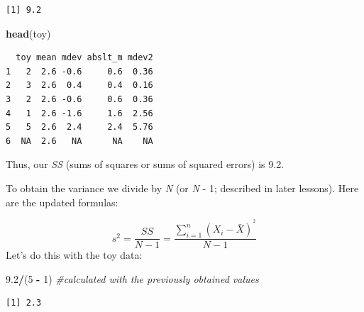 \documentclass[
  11pt,
]{book}
\newenvironment{Shaded}{\begin{snugshade}}{\end{snugshade}}
\newcommand{\AttributeTok}[1]{\textcolor[rgb]{0.27,0.27,0.27}{#1}}
\newcommand{\CommentTok}[1]{\textcolor[rgb]{0.37,0.37,0.37}{\textit{#1}}}
\newcommand{\ConstantTok}[1]{\textcolor[rgb]{0.37,0.37,0.37}{#1}}
\newcommand{\DecValTok}[1]{\textcolor[rgb]{0.06,0.06,0.06}{#1}}
\newcommand{\FloatTok}[1]{\textcolor[rgb]{0.06,0.06,0.06}{#1}}
\newcommand{\FunctionTok}[1]{\textcolor[rgb]{0.27,0.27,0.27}{\textbf{#1}}}
\newcommand{\NormalTok}[1]{#1}
\newcommand{\OtherTok}[1]{\textcolor[rgb]{0.37,0.37,0.37}{#1}}
\newcommand{\SpecialCharTok}[1]{\textcolor[rgb]{0.43,0.43,0.43}{\textbf{#1}}}
\begin{document}
\begin{verbatim}
[1] 9.2
\end{verbatim}

\begin{Shaded}
\begin{Highlighting}[]
\FunctionTok{head}\NormalTok{(toy)}
\end{Highlighting}
\end{Shaded}

\begin{verbatim}
  toy mean mdev abslt_m mdev2
1   2  2.6 -0.6     0.6  0.36
2   3  2.6  0.4     0.4  0.16
3   2  2.6 -0.6     0.6  0.36
4   1  2.6 -1.6     1.6  2.56
5   5  2.6  2.4     2.4  5.76
6  NA  2.6   NA      NA    NA
\end{verbatim}

Thus, our \emph{SS} (sums of squares or sums of squared errors) is 9.2.

To obtain the variance we divide by \emph{N} (or \emph{N} - 1; described in later lessons). Here are the updated formulas:

\[s^{2}=\frac{SS}{N-1}=\frac{\sum_{i=1}^{n}(X_{i} - \bar{X})^{^{2}}}{N-1}\] Let's do this with the toy data:

\begin{Shaded}
\begin{Highlighting}[]
\FloatTok{9.2}\SpecialCharTok{/}\NormalTok{(}\DecValTok{5} \SpecialCharTok{{-}} \DecValTok{1}\NormalTok{)  }\CommentTok{\#calculated with the previously obtained values}
\end{Highlighting}
\end{Shaded}

\begin{verbatim}
[1] 2.3
\end{verbatim}

\begin{Shaded}
\end{Shaded}
\end{document}
